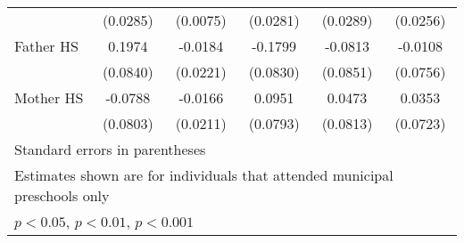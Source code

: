 \begin{table}[htbp]
\begin{tabular}{l*{5}{c}}
            &    (0.0285)         &    (0.0075)         &    (0.0281)         &    (0.0289)         &    (0.0256)         \\
\addlinespace
Father HS   &      0.1974\sym{*}  &     -0.0184         &     -0.1799\sym{*}  &     -0.0813         &     -0.0108         \\
            &    (0.0840)         &    (0.0221)         &    (0.0830)         &    (0.0851)         &    (0.0756)         \\
\addlinespace
Mother HS   &     -0.0788         &     -0.0166         &      0.0951         &      0.0473         &      0.0353         \\
            &    (0.0803)         &    (0.0211)         &    (0.0793)         &    (0.0813)         &    (0.0723)         \\
\bottomrule
\multicolumn{6}{l}{\footnotesize Standard errors in parentheses}\\
\multicolumn{6}{l}{\footnotesize Estimates shown are for individuals that attended municipal preschools only}\\
\multicolumn{6}{l}{\footnotesize \sym{*} \(p<0.05\), \sym{**} \(p<0.01\), \sym{***} \(p<0.001\)}\\
\end{tabular}
\end{table}
